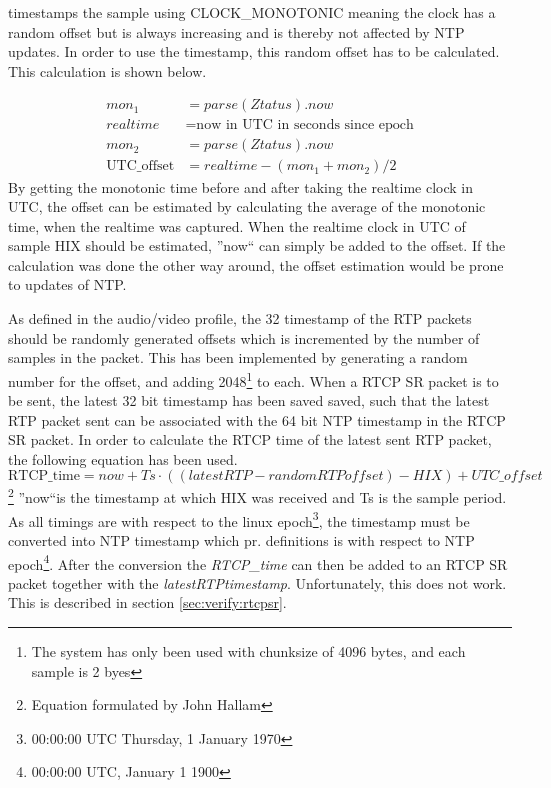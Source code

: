  timestamps the sample using CLOCK\_MONOTONIC meaning the clock has a random offset but is always increasing and is thereby not affected by \ac{NTP} updates. In order to use the timestamp, this random offset has to be calculated. This calculation is shown below.

\begin{align}
	mon_1 &= parse(Ztatus).now \\
	realtime &= \text{now in UTC in seconds since epoch} \\
	mon_2 &= parse(Ztatus).now \\
	\text{UTC\_offset} &= realtime-(mon_1+mon_2)/2 
\end{align}
By getting the monotonic time before and after taking the realtime clock in UTC, the offset can be estimated by calculating the average of the monotonic time, when the realtime was captured. When the realtime clock in UTC of sample HIX should be estimated, ''now`` can simply be added to the offset.  If the calculation was done the other way around, the offset estimation would be prone to updates of NTP.

As defined in the audio/video profile, the 32 timestamp of the RTP packets should be randomly generated offsets which is incremented by the number of samples in the packet. This has been implemented by generating a random number for the offset, and adding 2048\footnote{The system has only been used with chunksize of 4096 bytes, and each sample is 2 byes} to each. When a RTCP SR packet is to be sent, the latest 32 bit timestamp has been saved saved, such that the latest RTP packet sent can be associated with the 64 bit NTP timestamp in the RTCP SR packet. In order to calculate the RTCP time of the latest sent RTP packet, the following equation has been used.
\begin{equation}
	\text{RTCP\_time} = now + Ts\cdot((latestRTP-\textit{randomRTPoffset})-HIX)+\textit{UTC\_offset}
\end{equation} \footnote{Equation formulated by John Hallam}
''now``is the timestamp at which HIX was received and Ts is the sample period.
As all timings are with respect to the linux epoch\footnote{00:00:00 UTC Thursday, 1 January 1970}, the timestamp must be converted into NTP timestamp  which pr. definitions is with respect to NTP epoch\footnote{00:00:00 UTC, January 1 1900}. After the conversion the \textit{RTCP\_time} can then be added to an RTCP SR packet together with the \textit{latestRTPtimestamp}. 
Unfortunately, this does not work. This is described in section \ref{sec:verify:rtcpsr}.

